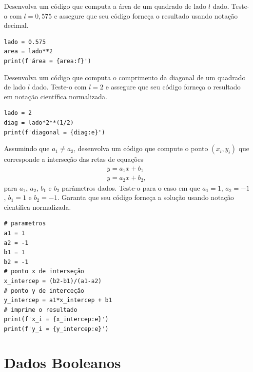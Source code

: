 \begin{exer}
  Desenvolva um código {\python} que computa a área de um quadrado de lado $l$ dado. Teste-o com $l=0,575$ e assegure que seu código forneça o resultado usando notação decimal.
\end{exer}
\begin{resp}
\begin{lstlisting}
lado = 0.575
area = lado**2
print(f'área = {area:f}')
\end{lstlisting}
\end{resp}

\begin{exer}
  Desenvolva um código {\python} que computa o comprimento da diagonal de um quadrado de lado $l$ dado. Teste-o com $l=2$ e assegure que seu código forneça o resultado em notação científica normalizada.
\end{exer}
\begin{resp}
\begin{lstlisting}
lado = 2
diag = lado*2**(1/2)
print(f'diagonal = {diag:e}')
\end{lstlisting}
\end{resp}

\begin{exer}
  Assumindo que $a_1\neq a_2$, desenvolva um código {\python} que compute o ponto $(x_{i}, y_i)$ que corresponde a interseção das retas de equações
  \begin{gather}
    y = a_1x + b_1\\
    y = a_2x + b_2,
  \end{gather}
  para $a_1$, $a_2$, $b_1$ e $b_2$ parâmetros dados. Teste-o para o caso em que $a_1=1$, $a_2=-1$, $b_1=1$ e $b_2=-1$. Garanta que seu código forneça a solução usando notação científica normalizada.
\end{exer}
\begin{resp}
\begin{lstlisting}
# parametros
a1 = 1
a2 = -1
b1 = 1
b2 = -1
# ponto x de interseção
x_intercep = (b2-b1)/(a1-a2)
# ponto y de interceção
y_intercep = a1*x_intercep + b1
# imprime o resultado
print(f'x_i = {x_intercep:e}')
print(f'y_i = {y_intercep:e}')
\end{lstlisting}
\end{resp}


\section{Dados Booleanos}\label{cap_lingua_sec_bool}

